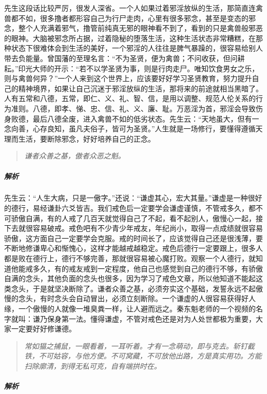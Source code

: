 先生这段话比较严厉，很发人深省。一个人如果过着邪淫放纵的生活，那简直连禽兽都不如，很多撸者都形容自己为行尸走肉，心里有很多邪念，甚至是变态的邪念，整个人充满着邪气，撸管前纯真无邪的眼神看不到了，看到的只是禽兽般邪恶的眼神。大脑被邪念所占据，过着隐秘的堕落生活，这种生活状态非常糟糕，在那种状态下很难体会到生活的美好，一个邪淫的人往往是脾气暴躁的，很容易给别人带去负能量。曾国藩的至理名言：“不为圣贤，便为禽兽；不问收获，但问耕耘。”印光大师的开示：“若不以学圣贤为事，则是行肉走尸。唯知饮食男女之乐，则与禽兽何异？”一个人来到这个世界上，应该要好好学习圣贤教育，努力提升自己的精神境界，如果让自己沉迷于邪淫放纵的生活，那将来的前途就相当黑暗了。人有五常和八德，五常，即仁、义、礼、智、信，是用以调整、规范人伦关系的行为准则。八德，即孝、悌、忠、信、礼、义、廉、耻。万恶淫为首，邪淫会导致伤身败德，最后八德全废，进入禽兽不如的低劣状态。先生云：“天地虽大，但有一念向善，心存良知，虽凡夫俗子，皆可为圣贤。”人生就是一场修行，要懂得遵循天理而生活，要断除邪念，好好培养自己的正念。

\begin{quote}\it
    谦者众善之基，傲者众恶之魁。
\end{quote}

\subparagraph{解析}

先生云：“人生大病，只是一傲字。”还说：“谦虚其心，宏大其量。”谦虚是一种很好的德行，易经谦卦六爻皆吉。我们戒色后一定要学会谦虚谨慎，不管戒多久，都不可骄傲自满，有的人戒了几百天就觉得自己了不起，看不起别人，傲慢心一起，接下去就很容易破戒。戒色吧有不少青少年戒友，年纪尚小，取得一点成绩就很容易骄傲，这方面自己一定要学会克服。戒的时间长了，应该觉得自己还是很浅薄，要不断地修谦卑心和惭愧心，这样才能越戒越稳定。戒色后德行一定要跟上，很多人都是败在德行上，德行不够完善，那就很容易被心魔打败。观察一个人德行，就知道他能戒多久，有的戒友戒到一定程度，他自己也感觉到自己的德行不够，有骄傲自满的念头，其他负面的念头也很多，因为学习了戒色文章，所以他知道不能起这类念头，于是就坚决断除了。谦者众善之基，必须夯实这个基础，发誓永远不起傲慢的念头，有时念头会自动冒出，必须立刻断除。一个谦虚的人很容易获得好人缘，一个傲慢的人就像一堆臭粪一样，让人避而远之。秦东魁老师的一个视频的名字就叫：谦乃保身第一法。懂得谦虚，不管对戒色还是对为人处世都极为重要，大家一定要好好修谦德。

\begin{quote}\it
    常如猫之捕鼠，一眼看着，一耳听着。才有一念萌动，即与克去。斩钉截铁，不可姑容，与他方便。不可窝藏，不可放他出路，方是真实用功。方能扫除廓清，到得无私可克，自有端拱时在。
\end{quote}

\subparagraph{解析}

